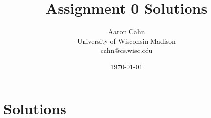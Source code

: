 \documentclass[12pt]{article}
\begin{document}
\title{Assignment 0 Solutions}
\date{\today}



\author{
Aaron Cahn\\
University of Wisconsin-Madison\\
cahn@cs.wisc.edu
}

\maketitle

\newpage
\section{Solutions} \label{sec:solutions} 

%
%
\end{document}
